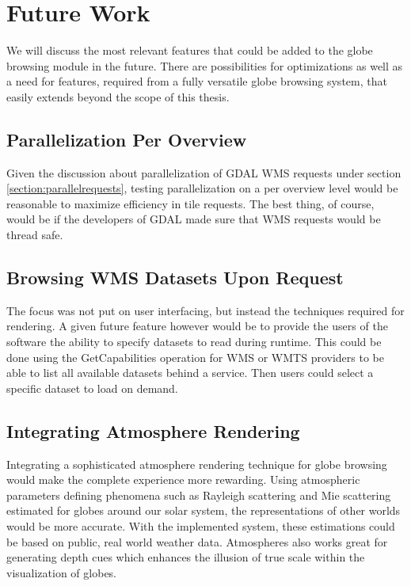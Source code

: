 \chapter{Future Work}

We will discuss the most relevant features that could be added to the globe browsing module in the future. There are possibilities for optimizations as well as a need for features, required from a fully versatile globe browsing system, that easily extends beyond the scope of this thesis.

\section{Parallelization Per Overview}
Given the discussion about parallelization of GDAL WMS requests under section \ref{section:parallelrequests}, testing parallelization on a per overview level would be reasonable to maximize efficiency in tile requests. The best thing, of course, would be if the developers of GDAL made sure that WMS requests would be thread safe.

\section{Browsing WMS Datasets Upon Request}
The focus was not put on user interfacing, but instead the techniques required for rendering. A given future feature however would be to provide the users of the software the ability to specify datasets to read during runtime. This could be done using the GetCapabilities operation for WMS or WMTS providers to be able to list all available datasets behind a service. Then users could select a specific dataset to load on demand.

\section{Integrating Atmosphere Rendering}
Integrating a sophisticated atmosphere rendering technique for globe browsing would make the complete experience more rewarding. Using atmospheric parameters defining phenomena such as Rayleigh scattering and Mie scattering estimated for globes around our solar system, the representations of other worlds would be more accurate. With the implemented system, these estimations could be based on public, real world weather data. Atmospheres also works great for generating depth cues which enhances the illusion of true scale within the visualization of globes.

